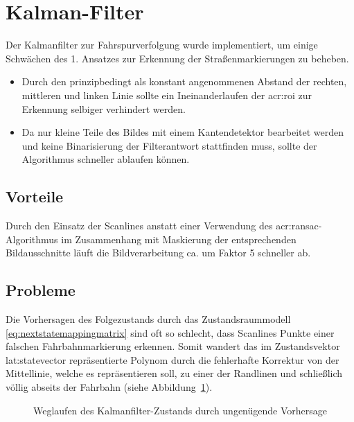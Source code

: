 \section{Kalman-Filter \dcsecondauthorshort}

Der Kalmanfilter zur Fahrspurverfolgung wurde implementiert, um einige Schwächen des 1. Ansatzes zur Erkennung der Straßenmarkierungen zu beheben.
\begin{itemize}
\item Durch den prinzipbedingt als konstant angenommenen Abstand der rechten, mittleren und linken Linie sollte ein \glqq Ineinanderlaufen\grqq{} der \gls{acr:roi} zur Erkennung selbiger verhindert werden.
\item Da nur kleine Teile des Bildes mit einem Kantendetektor bearbeitet werden und keine Binarisierung der Filterantwort stattfinden muss, sollte der Algorithmus schneller ablaufen können.
\end{itemize}

\subsection{Vorteile}
Durch den Einsatz der Scanlines anstatt einer Verwendung des \gls{acr:ransac}-Algorithmus im Zusammenhang mit Maskierung der entsprechenden Bildausschnitte läuft die Bildverarbeitung ca. um Faktor 5 schneller ab.

\subsection{Probleme}
Die Vorhersagen des Folgezustands durch das Zustandsraummodell \eqref{eq:nextstatemappingmatrix} sind oft so schlecht, dass Scanlines Punkte einer falschen Fahrbahnmarkierung erkennen. Somit \glqq wandert\grqq{} das im Zustandsvektor \gls{lat:statevector} repräsentierte Polynom durch die fehlerhafte Korrektur von der Mittellinie, welche es repräsentieren soll, zu einer der Randlinen und schließlich völlig abseits der Fahrbahn (siehe Abbildung~\ref{fig:evaluation:kalman:weggezogen}).

\begin{figure}[htbp] %
	\centering
	\quad
	\quad
	\quad
	\quad
	\caption{\glqq Weglaufen \grqq des Kalmanfilter-Zustands durch ungenügende Vorhersage}
	\label{fig:evaluation:kalman:weggezogen}
\end{figure}

